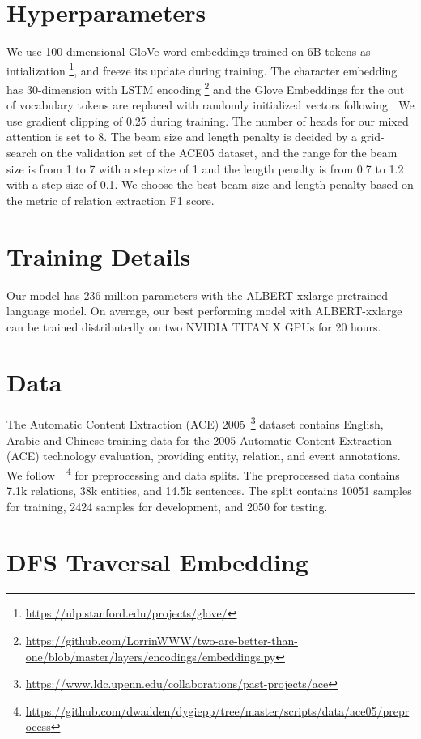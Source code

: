 \documentclass[11pt,a4paper]{article}
\begin{document}
\section{Hyperparameters}\label{hyper}
We use 100-dimensional GloVe word embeddings trained on 6B tokens as intialization \footnote{\url{https://nlp.stanford.edu/projects/glove/}}, and freeze its update during training. The character embedding has 30-dimension with LSTM encoding \footnote{\url{https://github.com/LorrinWWW/two-are-better-than-one/blob/master/layers/encodings/embeddings.py}} and the Glove Embeddings for the out of vocabulary tokens are replaced with randomly initialized vectors following \citet{tse}. We use gradient clipping of 0.25 during training. The number of heads for our mixed attention is set to 8. The beam size and length penalty is decided by a grid-search on the validation set of the ACE05 dataset, and the range for the beam size is from 1 to 7 with a step size of 1 and the length penalty is from 0.7 to 1.2 with a step size of 0.1. We choose the best beam size and length penalty based on the metric of relation extraction F1 score. 



\section{Training Details}\label{training}

Our model has 236 million parameters with the ALBERT-xxlarge pretrained language model. On average, our best performing model with ALBERT-xxlarge can be trained distributedly on two NVIDIA TITAN X GPUs for 20 hours.

\section{Data} \label{data}
The Automatic Content Extraction (ACE) 2005~\footnote{\url{https://www.ldc.upenn.edu/collaborations/past-projects/ace}} dataset contains English, Arabic and Chinese training data for the 2005 Automatic Content Extraction (ACE) technology evaluation, providing entity, relation, and event annotations. We follow~\citet{dygie}~\footnote{\url{https://github.com/dwadden/dygiepp/tree/master/scripts/data/ace05/preprocess}} for preprocessing and data splits. The preprocessed data contains 7.1k relations, 38k entities, and 14.5k sentences. The split contains 10051 samples for training, 2424 samples for development, and 2050 for testing.

\section{DFS Traversal Embedding}\label{dfst}
\end{document}
